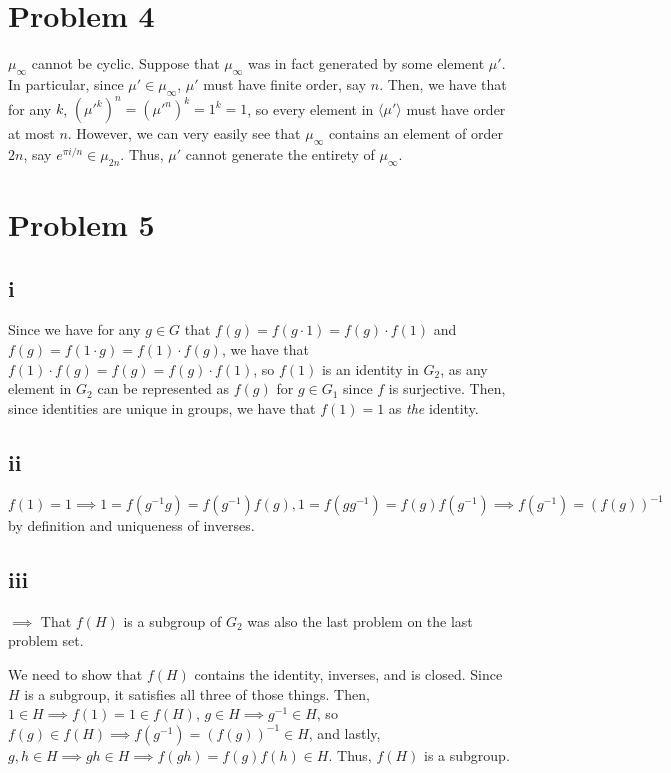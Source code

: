 \documentclass[12pt,letterpaper]{article}
\theoremstyle{definition}
\begin{document}
\section*{Problem 4}

$\mu_{\infty}$ cannot be cyclic. Suppose that $\mu_{\infty}$ was in fact generated by some element $\mu'$. In particular, since $\mu' \in \mu_{\infty}$, $\mu'$ must have finite order, say $n$. Then, we have that for any $k$, $(\mu'^{k})^{n} = (\mu'^{n})^{k} = 1^{k} = 1$, so every element in $\langle \mu' \rangle$ must have order at most $n$. However, we can very easily see that $\mu_{\infty}$ contains an element of order $2n$, say $e^{\pi i / n} \in \mu_{2n}$. Thus, $\mu'$ cannot generate the entirety of $\mu_{\infty}$.

\section*{Problem 5}

\subsection*{i}

Since we have for any $g \in G$ that $f(g) = f(g \cdot 1) = f(g) \cdot f(1)$ and $f(g) = f(1 \cdot g) = f(1) \cdot f(g)$, we have that $f(1) \cdot f(g) = f(g) = f(g) \cdot f(1)$, so $f(1)$ is an identity in $G_{2}$, as any element in $G_{2}$ can be represented as $f(g)$ for $g \in G_{1}$ since $f$ is surjective. Then, since identities are unique in groups, we have that $f(1) = 1$ as \textit{the} identity.

\subsection*{ii}

\[
  f(1) = 1 \implies 1 = f(g^{-1}g) = f(g^{-1})f(g), 1 = f(gg^{-1}) = f(g)f(g^{-1}) \implies f(g^{-1}) = (f(g))^{-1}
\]
by definition and uniqueness of inverses.

\subsection*{iii}

$\implies$ That $f(H)$ is a subgroup of $G_{2}$ was also the last problem on the last problem set.

We need to show that $f(H)$ contains the identity, inverses, and is closed. Since $H$ is a subgroup, it satisfies all three of those things. Then, $1 \in H \implies f(1) = 1 \in f(H)$, $g \in H \implies g^{-1} \in H$, so $f(g) \in f(H) \implies f(g^{-1}) = (f(g))^{-1} \in H$, and lastly, $g,h \in H \implies gh \in H \implies f(gh) = f(g)f(h) \in H$. Thus, $f(H)$ is a subgroup.
\end{document}
